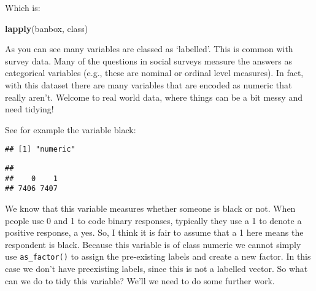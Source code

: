 \documentclass[
]{book}
\newenvironment{Shaded}{\begin{snugshade}}{\end{snugshade}}
\newcommand{\CommentTok}[1]{\textcolor[rgb]{0.56,0.35,0.01}{\textit{#1}}}
\newcommand{\FunctionTok}[1]{\textcolor[rgb]{0.13,0.29,0.53}{\textbf{#1}}}
\newcommand{\NormalTok}[1]{#1}
\newcommand{\OtherTok}[1]{\textcolor[rgb]{0.56,0.35,0.01}{#1}}
\newcommand{\SpecialCharTok}[1]{\textcolor[rgb]{0.81,0.36,0.00}{\textbf{#1}}}
\begin{document}
Which is:

\begin{Shaded}
\begin{Highlighting}[]
\FunctionTok{lapply}\NormalTok{(banbox, class)}
\end{Highlighting}
\end{Shaded}

As you can see many variables are classed as `labelled'. This is common with survey data. Many of the questions in social surveys measure the answers as categorical variables (e.g., these are nominal or ordinal level measures). In fact, with this dataset there are many variables that are encoded as numeric that really aren't. Welcome to real world data, where things can be a bit messy and need tidying!

See for example the variable black:

\begin{Shaded}
\end{Shaded}

\begin{verbatim}
## [1] "numeric"
\end{verbatim}

\begin{Shaded}
\end{Shaded}

\begin{verbatim}
## 
##    0    1 
## 7406 7407
\end{verbatim}

We know that this variable measures whether someone is black or not. When people use 0 and 1 to code binary responses, typically they use a 1 to denote a positive response, a yes. So, I think it is fair to assume that a 1 here means the respondent is black. Because this variable is of class numeric we cannot simply use \texttt{as\_factor()} to assign the pre-existing labels and create a new factor. In this case we don't have preexisting labels, since this is not a labelled vector. So what can we do to tidy this variable? We'll we need to do some further work.

\begin{Shaded}
\end{Shaded}
\end{document}
